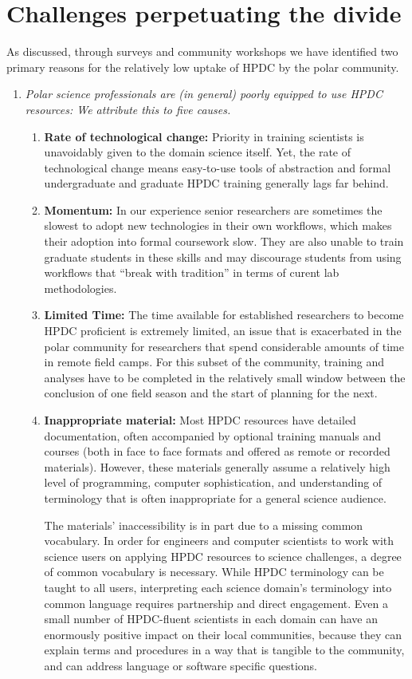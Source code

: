 \documentclass[conference]{IEEEtran}
\begin{document}
\section{Challenges perpetuating the divide}
As discussed, through surveys and community workshops we have identified two primary reasons for the relatively low uptake of HPDC by the polar community.  

\begin{enumerate}[\setlength{\listparindent}{\parindent}]
\item \textit{Polar science professionals are (in general) poorly equipped to use HPDC resources:
We attribute this to five causes.}
\begin{enumerate}[\setlength{\listparindent}{\parindent}]
\item \textbf{Rate of technological change:} Priority in training scientists is unavoidably given to the domain science itself. Yet, the rate of technological change means easy-to-use tools of abstraction and formal undergraduate and graduate HPDC training generally lags far behind. 
\item \textbf{Momentum: } In our experience senior researchers are sometimes the slowest to adopt new technologies in their own workflows, which makes their adoption into formal coursework slow. They are also unable to train graduate students in these skills and may discourage students from using workflows that ``break with tradition'' in terms of curent lab methodologies.
\item \textbf{Limited Time: }The time available for established researchers to become HPDC proficient is extremely limited, an issue that is exacerbated in the polar community for researchers that spend considerable amounts of time in remote field camps. For this subset of the community, training and analyses have to be completed in the relatively small window between the conclusion of one field season and the start of planning for the next. 
\item \textbf{Inappropriate material: }Most HPDC resources have detailed documentation, often accompanied by optional training manuals and courses (both in face to face formats and offered as remote or recorded materials). However, these materials generally assume a relatively high level of programming, computer sophistication, and understanding of terminology that is often inappropriate for a general science audience.  

The materials' inaccessibility is in part due to a missing common vocabulary. In order for engineers and computer scientists to work with science users on applying HPDC resources to science challenges, a degree of common vocabulary is necessary. While HPDC terminology can be taught to all users, interpreting each science domain's terminology into common language requires partnership and direct engagement. Even a small number of HPDC-fluent scientists in each domain can have an enormously positive impact on their local communities, because they can explain terms and procedures in a way that is tangible to the community, and can address language or software specific questions.


\end{enumerate}
\end{enumerate}
\end{document}
